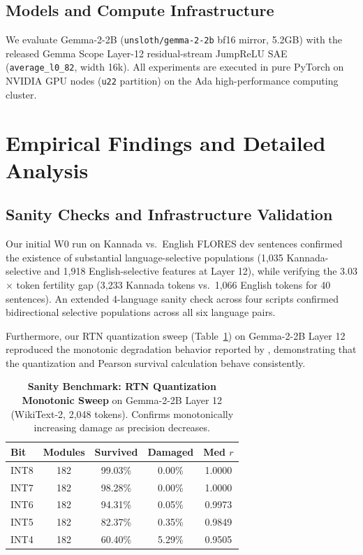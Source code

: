 \documentclass[11pt]{article}
\begin{document}
\subsection{Models and Compute Infrastructure}
We evaluate Gemma-2-2B (\texttt{unsloth/gemma-2-2b} bf16 mirror, 5.2GB) with the released Gemma Scope Layer-12 residual-stream JumpReLU SAE (\texttt{average\_l0\_82}, width 16k). All experiments are executed in pure PyTorch %
 on NVIDIA GPU nodes (\texttt{u22} partition) on the Ada high-performance computing cluster.

\section{Empirical Findings and Detailed Analysis}

\subsection{Sanity Checks and Infrastructure Validation}
Our initial W0 run on Kannada vs.\ English FLORES dev sentences confirmed the existence of substantial language-selective populations (1,035 Kannada-selective and 1,918 English-selective features at Layer 12), while verifying the 3.03$\times$ token fertility gap (3,233 Kannada tokens vs.\ 1,066 English tokens for 40 sentences). An extended 4-language sanity check across four scripts confirmed bidirectional selective populations across all six language pairs.

Furthermore, our RTN quantization sweep (Table~\ref{tab:rtn_sweep}) on Gemma-2-2B Layer 12 reproduced the monotonic degradation behavior reported by \citet{duan2026perplexity}, demonstrating that the quantization and Pearson survival calculation behave consistently.

\begin{table}[h]
\centering
\small
\setlength{\tabcolsep}{4.5pt}
\begin{tabular}{lcccc}
\toprule
\textbf{Bit} & \textbf{Modules} & \textbf{Survived} & \textbf{Damaged} & \textbf{Med $r$} \\
\midrule
INT8 & 182 & 99.03\% & 0.00\% & 1.0000 \\
INT7 & 182 & 98.28\% & 0.00\% & 1.0000 \\
INT6 & 182 & 94.31\% & 0.05\% & 0.9973 \\
INT5 & 182 & 82.37\% & 0.35\% & 0.9849 \\
INT4 & 182 & 60.40\% & 5.29\% & 0.9505 \\
\bottomrule
\end{tabular}
\caption{\textbf{Sanity Benchmark: RTN Quantization Monotonic Sweep} on Gemma-2-2B Layer 12 (WikiText-2, 2,048 tokens). Confirms monotonically increasing damage as precision decreases.}
\label{tab:rtn_sweep}
\end{table}
\end{document}
